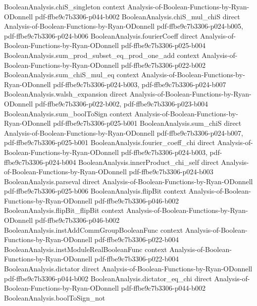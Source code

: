 \begin{theorem}
\proofstep
  {BooleanAnalysis.chiS_singleton}
  {context}
  {Analysis-of-Boolean-Functions-by-Ryan-ODonnell}
  {pdf-ffbe9c7b3306-p044-b002}
\proofstep
  {BooleanAnalysis.chiS_mul_chiS}
  {direct}
  {Analysis-of-Boolean-Functions-by-Ryan-ODonnell}
  {pdf-ffbe9c7b3306-p024-b005,
    pdf-ffbe9c7b3306-p024-b006}
\proofstep
  {BooleanAnalysis.fourierCoeff}
  {direct}
  {Analysis-of-Boolean-Functions-by-Ryan-ODonnell}
  {pdf-ffbe9c7b3306-p025-b004}
\proofstep
  {BooleanAnalysis.sum_prod_subset_eq_prod_one_add}
  {context}
  {Analysis-of-Boolean-Functions-by-Ryan-ODonnell}
  {pdf-ffbe9c7b3306-p022-b002}
\proofstep
  {BooleanAnalysis.sum_chiS_mul_eq}
  {context}
  {Analysis-of-Boolean-Functions-by-Ryan-ODonnell}
  {pdf-ffbe9c7b3306-p024-b003,
    pdf-ffbe9c7b3306-p024-b007}
\proofstep
  {BooleanAnalysis.walsh_expansion}
  {direct}
  {Analysis-of-Boolean-Functions-by-Ryan-ODonnell}
  {pdf-ffbe9c7b3306-p022-b002,
    pdf-ffbe9c7b3306-p023-b004}
\proofstep
  {BooleanAnalysis.sum_boolToSign}
  {context}
  {Analysis-of-Boolean-Functions-by-Ryan-ODonnell}
  {pdf-ffbe9c7b3306-p025-b001}
\proofstep
  {BooleanAnalysis.sum_chiS}
  {direct}
  {Analysis-of-Boolean-Functions-by-Ryan-ODonnell}
  {pdf-ffbe9c7b3306-p024-b007,
    pdf-ffbe9c7b3306-p025-b001}
\proofstep
  {BooleanAnalysis.fourier_coeff_chi}
  {direct}
  {Analysis-of-Boolean-Functions-by-Ryan-ODonnell}
  {pdf-ffbe9c7b3306-p024-b003,
    pdf-ffbe9c7b3306-p024-b004}
\proofstep
  {BooleanAnalysis.innerProduct_chi_self}
  {direct}
  {Analysis-of-Boolean-Functions-by-Ryan-ODonnell}
  {pdf-ffbe9c7b3306-p024-b003}
\proofstep
  {BooleanAnalysis.parseval}
  {direct}
  {Analysis-of-Boolean-Functions-by-Ryan-ODonnell}
  {pdf-ffbe9c7b3306-p025-b006}
\proofstep
  {BooleanAnalysis.flipBit}
  {context}
  {Analysis-of-Boolean-Functions-by-Ryan-ODonnell}
  {pdf-ffbe9c7b3306-p046-b002}
\proofstep
  {BooleanAnalysis.flipBit_flipBit}
  {context}
  {Analysis-of-Boolean-Functions-by-Ryan-ODonnell}
  {pdf-ffbe9c7b3306-p046-b002}
\proofstep
  {BooleanAnalysis.instAddCommGroupBooleanFunc}
  {context}
  {Analysis-of-Boolean-Functions-by-Ryan-ODonnell}
  {pdf-ffbe9c7b3306-p022-b004}
\proofstep
  {BooleanAnalysis.instModuleRealBooleanFunc}
  {context}
  {Analysis-of-Boolean-Functions-by-Ryan-ODonnell}
  {pdf-ffbe9c7b3306-p022-b004}
\proofstep
  {BooleanAnalysis.dictator}
  {direct}
  {Analysis-of-Boolean-Functions-by-Ryan-ODonnell}
  {pdf-ffbe9c7b3306-p044-b002}
\proofstep
  {BooleanAnalysis.dictator_eq_chi}
  {direct}
  {Analysis-of-Boolean-Functions-by-Ryan-ODonnell}
  {pdf-ffbe9c7b3306-p044-b002}
\proofstep
  {BooleanAnalysis.boolToSign_not}

\end{theorem}
